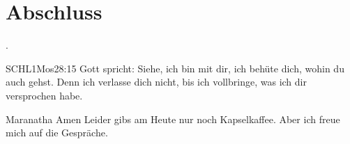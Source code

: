 \documentclass{../../inc/mybib}
\begin{document}





\section{Abschluss}

 .

\beten{}

\begin{bibelbox}{SCHL}{1Mos}{28:15}
    Gott spricht: Siehe, ich bin mit dir,
    ich behüte dich, wohin du auch gehst.
    Denn ich verlasse dich nicht,
    bis ich vollbringe, was ich dir versprochen habe.
\end{bibelbox}

Maranatha Amen
Leider gibs am Heute nur noch Kapselkaffee. Aber ich freue mich auf die Gespräche.
\end{document}
